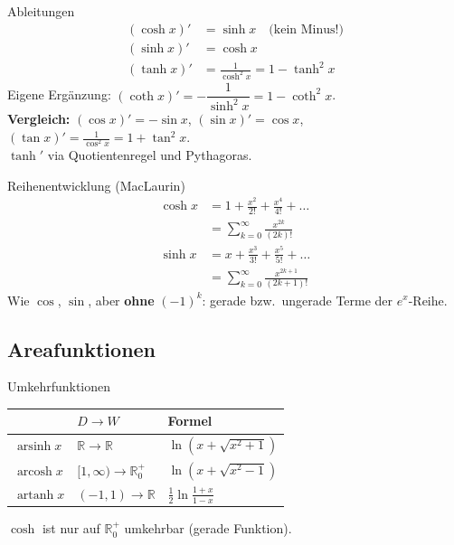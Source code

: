 \documentclass[a4paper, fontsize=7pt]{scrartcl}
\def\R{\mathbb{R}}  %
\renewcommand*{\arraystretch}{1.5}  %
\begin{document}
\begin{mainbox}{Ableitungen}
\begin{align*}
(\cosh x)' &= \sinh x \quad \text{(kein Minus!)}\\
(\sinh x)' &= \cosh x\\
(\tanh x)' &= \frac{1}{\cosh^2 x} = 1 - \tanh^2 x
\end{align*}
Eigene Ergänzung: $(\coth x)' = -\dfrac{1}{\sinh^2 x} = 1 - \coth^2 x$.\\
\textbf{Vergleich:} $(\cos x)' = -\sin x$, $(\sin x)' = \cos x$,
$(\tan x)' = \frac{1}{\cos^2 x} = 1 + \tan^2 x$.\\
$\tanh'$ via Quotientenregel und Pythagoras.
\end{mainbox}

\begin{mainbox}{Reihenentwicklung (MacLaurin)}
\begin{align*}
\cosh x &= 1 + \frac{x^2}{2!} + \frac{x^4}{4!} + \ldots\\
&= \sum_{k=0}^{\infty} \frac{x^{2k}}{(2k)!}\\
\sinh x &= x + \frac{x^3}{3!} + \frac{x^5}{5!} + \ldots\\
&= \sum_{k=0}^{\infty} \frac{x^{2k+1}}{(2k+1)!}
\end{align*}
Wie $\cos$, $\sin$, aber \textbf{ohne} $(-1)^k$: gerade bzw.\ ungerade Terme der
$e^x$-Reihe.
\end{mainbox}

\subsection{Areafunktionen}

\begin{mainbox}{Umkehrfunktionen}
\renewcommand*{\arraystretch}{1.6}
\setlength{\tabcolsep}{3pt}
\begin{tabularx}{\linewidth}{@{}l|l|>{\raggedright\arraybackslash}X@{}}
 & $D \to W$ & \textbf{Formel} \\
\hline
$\operatorname{arsinh} x$ & $\R \to \R$ & $\ln\left(x + \sqrt{x^2 + 1}\right)$ \\
$\operatorname{arcosh} x$ & $[1,\infty) \to \R_0^+$ &
  $\ln\left(x + \sqrt{x^2 - 1}\right)$ \\
$\operatorname{artanh} x$ & $(-1,1) \to \R$ &
  $\frac{1}{2}\ln\frac{1 + x}{1 - x}$ \\
\end{tabularx}
$\cosh$ ist nur auf $\R_0^+$ umkehrbar (gerade Funktion).
\end{mainbox}
\end{document}
